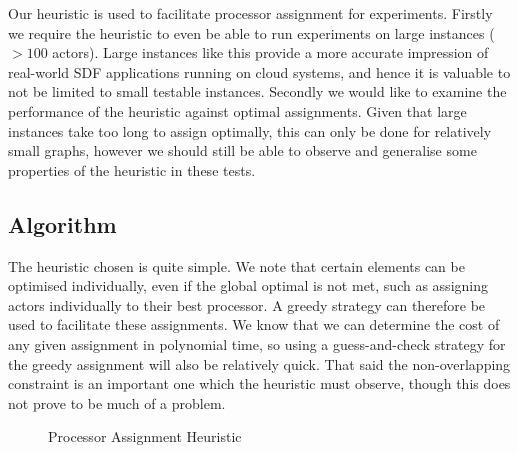 Our heuristic is used to facilitate processor assignment for experiments.
Firstly we require the heuristic to even be able to run experiments on large instances ($> 100$ actors).
Large instances like this provide a more accurate impression of real-world SDF applications running on cloud systems, and hence it is valuable to not be limited to small testable instances.
Secondly we would like to examine the performance of the heuristic against optimal assignments.
Given that large instances take too long to assign optimally, this can only be done for relatively small graphs, however we should still be able to observe and generalise some properties of the heuristic in these tests.

\subsection{Algorithm}

The heuristic chosen is quite simple.
We note that certain elements can be optimised individually, even if the global optimal is not met, such as assigning actors individually to their best processor.
A greedy strategy can therefore be used to facilitate these assignments.
We know that we can determine the cost of any given assignment in polynomial time, so using a guess-and-check strategy for the greedy assignment will also be relatively quick.
That said the non-overlapping constraint is an important one which the heuristic must observe, though this does not prove to be much of a problem.

\begin{figure}
\begin{center}
\caption{Processor Assignment Heuristic}
\label{figAlgAlg}
\end{center}
\end{figure}

